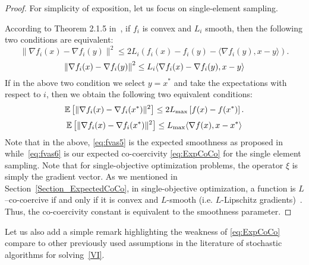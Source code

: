 \documentclass{article}
\begin{document}
\begin{proof}
For simplicity of exposition, let us focus on single-element sampling. 

According to Theorem 2.1.5 in~\citet{nesterov2013introductory}, if $f_i$ is convex and $L_i$ smooth, then the following two conditions are equivalent:
\begin{equation}\label{eq:fvas3}
	\|\nabla f_i(x) - \nabla f_i(y)\|^2 \leq 2L_i \left( f_i(x) - f_i(y) - \langle \nabla f_i(y), x-y \rangle \right).
	\end{equation}
	\begin{equation}\label{eq:fvas4}
	\left\| \nabla f_i(x)-\nabla f_i(y)\right\|^2 \leq L_i  \langle \nabla f_i(x)-  \nabla f_i(y),x-y\rangle
	\end{equation}
If in the above two condition we select $y=x^*$  and take the expectations with respect to $i$, then we obtain the following two equivalent conditions:
\begin{equation}\label{eq:fvas5}
	\mathbb{E}\left[\|\nabla f_i(x) - \nabla f_i(x^*)\|^2\right] \leq 2 L_{\max} \left[ f(x) - f(x^*) \right].
	\end{equation}
	\begin{equation}\label{eq:fvas6}
	\mathbb{E}\left[\|\nabla f_i(x) - \nabla f_i(x^*)\|^2\right] \leq L_{\max} \langle \nabla f(x),x-x^*\rangle
	\end{equation}
Note that in the above, \eqref{eq:fvas5} is the expected smoothness as proposed in \cite{gower2019sgd} while~\eqref{eq:fvas6} is our expected co-coercivity \eqref{eq:ExpCoCo} for the single element sampling.  Note that for single-objective optimization problems, the operator $\xi$ is simply the gradient vector. As we mentioned in Section~\ref{Section_ExpectedCoCo}, in single-objective optimization, a function is $L$--co-coercive if and only if it is convex and $L$-smooth (i.e. $L$-Lipschitz gradients)~\citep{bauschke2011convex}. Thus, the co-coercivity constant is equivalent to the smoothness parameter. 
\end{proof}

Let us also add a simple remark highlighting the weakness of \ref{eq:ExpCoCo} compare to other previously used assumptions in the literature of stochastic algorithms for solving~\eqref{VI}.
\end{document}
